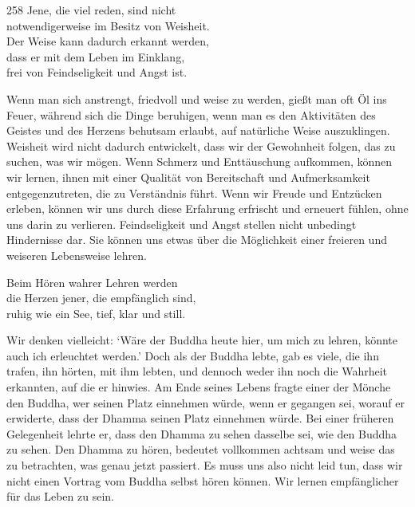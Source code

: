
\begin{dhpVerse}{258}
\label{dhp-258}
Jene, die viel reden, sind nicht\\
notwendigerweise im Besitz von Weisheit.\\
Der Weise kann dadurch erkannt werden,\\
dass er mit dem Leben im Einklang,\\
frei von Feindseligkeit und Angst ist.
\end{dhpVerse}

\begin{dhpRefl}

Wenn man sich anstrengt, friedvoll und weise zu werden, gießt man oft Öl ins
Feuer, während sich die Dinge beruhigen, wenn man es den Aktivitäten des
Geistes und des Herzens behutsam erlaubt, auf natürliche Weise auszuklingen.
Weisheit wird nicht dadurch entwickelt, dass wir der Gewohnheit folgen, das zu
suchen, was wir mögen. Wenn Schmerz und Enttäuschung aufkommen, können wir
lernen, ihnen mit einer Qualität von Bereitschaft und Aufmerksamkeit
entgegenzutreten, die zu Verständnis führt. Wenn wir Freude und Entzücken
erleben, können wir uns durch diese Erfahrung erfrischt und erneuert fühlen,
ohne uns darin zu verlieren. Feindseligkeit und Angst stellen nicht unbedingt
Hindernisse dar. Sie können uns etwas über die Möglichkeit einer freieren und
weiseren Lebensweise lehren.

\end{dhpRefl}


\begin{dhpVerse}{82}
\label{dhp-82}
Beim Hören wahrer Lehren werden\\ 
die Herzen jener, die empfänglich sind,\\ 
ruhig wie ein See, tief, klar und still. 
\end{dhpVerse}

\begin{dhpRefl}

Wir denken vielleicht: `Wäre der Buddha heute hier, um mich zu lehren, könnte
auch ich erleuchtet werden.’ Doch als der Buddha lebte, gab es viele, die ihn
trafen, ihn hörten, mit ihm lebten, und dennoch weder ihn noch die Wahrheit
erkannten, auf die er hinwies. Am Ende seines Lebens fragte einer der Mönche
den Buddha, wer seinen Platz einnehmen würde, wenn er gegangen sei, worauf er
erwiderte, dass der Dhamma seinen Platz einnehmen würde. Bei einer früheren
Gelegenheit lehrte er, dass den Dhamma zu sehen dasselbe sei, wie den Buddha
zu sehen. Den Dhamma zu hören, bedeutet vollkommen achtsam und weise das zu
betrachten, was genau jetzt passiert. Es muss uns also nicht leid tun, dass
wir nicht einen Vortrag vom Buddha selbst hören können. Wir lernen
empfänglicher für das Leben zu sein.

\end{dhpRefl}

